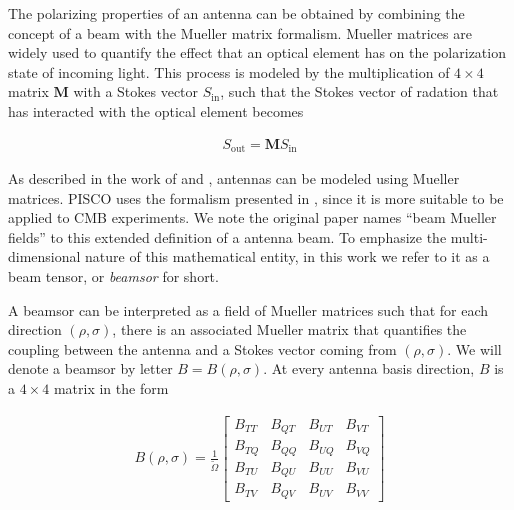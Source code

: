 \documentclass[a4paper,11pt]{article}
\newcommand{\co}{\mathbin{\|}}
\newcommand{\cx}{\mathbin{\times}}
\begin{document}

The polarizing properties of an antenna can be obtained by combining the concept of a beam with the Mueller matrix formalism. Mueller matrices are widely used to quantify the effect that an optical element has on the polarization state of incoming light. This process is modeled by the multiplication of $4\times4$ matrix $\mathbf{M}$ with a Stokes vector $S_{\mathrm{in}}$, such that the Stokes vector of radation that has interacted with the optical element becomes

\begin{equation}
\begin{aligned}
S_{\mathrm{out}} = \mathbf{M} S_{\mathrm{in}}
\end{aligned}
\end{equation}

\noindent
As described in the work of \cite{piepmeier_long_njoku_2008} and \cite{2007MNRAS.376.1767O}, antennas can be modeled using Mueller matrices. PISCO uses the formalism presented in \cite{2007MNRAS.376.1767O}, since it is more suitable to be applied to CMB experiments. We note the original paper names ``beam Mueller fields'' to this extended definition of a antenna beam. To emphasize the multi-dimensional nature of this mathematical entity, in this work we refer to it as a beam tensor, or \textsl{beamsor} for short.

A beamsor can be interpreted as a field of Mueller matrices such that for each direction $(\rho,\sigma)$, there is an associated Mueller matrix that quantifies the coupling between the antenna and a Stokes vector coming from $(\rho,\sigma)$. We will denote a beamsor by letter $B = B(\rho,\sigma)$. At every antenna basis direction, $B$ is a $4\times4$ matrix in the form

\begin{equation}
\begin{aligned}
B(\rho,\sigma) = \frac{1}{\tilde{\Omega}}
\begin{bmatrix}
B_{TT} & B_{QT} & B_{UT} & B_{VT}\\
B_{TQ} & B_{QQ} & B_{UQ} & B_{VQ}\\
B_{TU} & B_{QU} & B_{UU} & B_{VU}\\
B_{TV} & B_{QV} & B_{UV} & B_{VV}
\end{bmatrix}
\end{aligned}
\label{eq::beamsor}
\end{equation}
\end{document}
